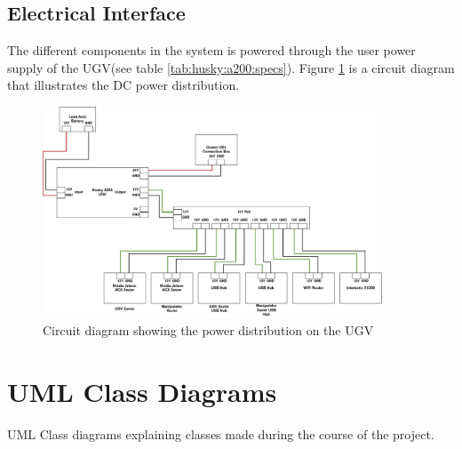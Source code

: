 \section{Electrical Interface}\label{A:ElectricalInterface}
The different components in the system is powered through the user power supply of the UGV(see table \ref{tab:husky:a200:specs}). Figure \ref{fig:circuit_diagram} is a circuit diagram that illustrates the DC power distribution.
\begin{figure}[htp]
  \centering
  \includegraphics[angle=-90, width = 0.9\textwidth]{Figures/circuit_diagram.drawio.png}
  \caption{Circuit diagram showing the power distribution on the UGV}
  \label{fig:circuit_diagram}
\end{figure}

% 

\chapter{UML Class Diagrams}
UML Class diagrams explaining classes made during the course of the project.

